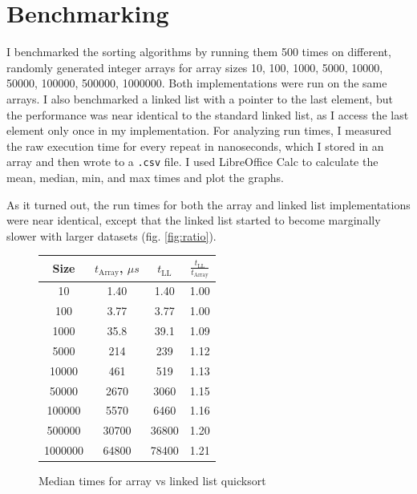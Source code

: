 \documentclass[a4paper,11pt]{article}
\begin{document}
    \section*{Benchmarking}

    I benchmarked the sorting algorithms by running them 500 times on different, randomly generated integer arrays for array sizes 10, 100, 1000, 5000, 10000, 50000, 100000, 500000, 1000000. Both implementations were run on the same arrays. I also benchmarked a linked list with a pointer to the last element, but the performance was near identical to the standard linked list, as I access the last element only once in my implementation. For analyzing run times, I measured the raw execution time for every repeat in nanoseconds, which I stored in an array and then wrote to a \texttt{.csv} file. I used LibreOffice Calc to calculate the mean, median, min, and max times and plot the graphs.

    As it turned out, the run times for both the array and linked list implementations were near identical, except that the linked list started to become marginally slower with larger datasets (fig. \ref{fig:ratio}).

    \begin{figure}[H]
        \centering
        
        \begin{tabular}{c|c|c|c}
            Size & $t_\text{Array}$, $\mu s$ & $t_\text{LL}$ & $\frac{t_\text{LL}}{t_\text{Array}}$ \\
            \hline
            \hline
            10 & 1.40 & 1.40 & 1.00 \\
            \hline
            100 & 3.77 & 3.77 & 1.00 \\
            \hline
            1000 & 35.8 & 39.1 & 1.09 \\
            \hline
            5000 & 214 & 239 & 1.12 \\
            \hline
            10000 & 461 & 519 & 1.13 \\
            \hline
            50000 & 2670 & 3060 & 1.15 \\
            \hline
            100000 & 5570 & 6460 & 1.16 \\
            \hline
            500000 & 30700 & 36800 & 1.20 \\
            \hline
            1000000 & 64800 & 78400 & 1.21 \\
        \end{tabular}

        \caption{Median times for array vs linked list quicksort}
    \end{figure}
\end{document}
